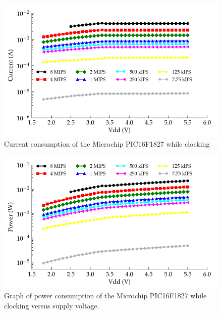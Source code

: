 \begin{figure}
\begin{centering}
\includegraphics{content/appendices/microprocessorPowerMeasurements/graphics/Graph_PIC16F1827_Clock_Current}
\par\end{centering}

\protect\caption{\label{fig:16F1827ClkCurrent}Current consumption of the Microchip
PIC16F1827 while clocking}
\end{figure}

\begin{figure}
  \centering
    \includegraphics{content/appendices/microprocessorPowerMeasurements/graphics/Graph_PIC16F1827_Clock_Power}
  \caption{\label{fig:16F1827ClkPower}Graph of power consumption of the Microchip PIC16F1827 while clocking versus supply voltage.}
\end{figure}

